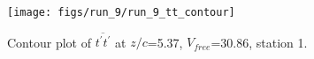 \begin{figure}[H]
\centering
\texttt{[image: figs/run\_9/run\_9\_tt\_contour]}
\caption{Contour plot of $\overline{t^\prime t^\prime}$ at $z/c$=5.37, $V_{free}$=30.86, station 1.}
\label{fig:run_9_tt_contour}
\end{figure}


